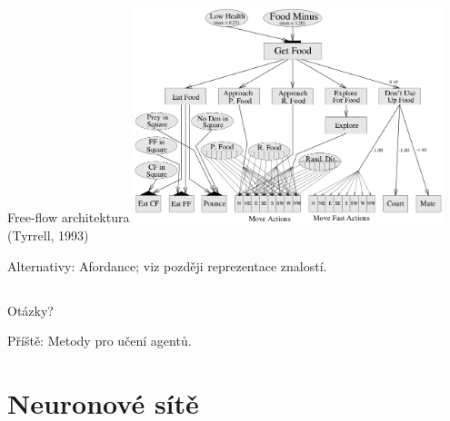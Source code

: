 \documentclass{beamer}
\begin{document}
\subsection{}
\begin{frame}{Free-flow architektura}
\includegraphics[width=9cm]{freeflow.png}
\hfill {\tiny (Tyrrell, 1993)}

Alternativy: Afordance; viz později reprezentace znalostí.
\end{frame}

\subsection{}
\begin{frame}{Otázky?}
\begin{center}
Příště: Metody pro učení agentů.
\end{center}
\end{frame}

\section{Neuronové sítě}
\end{document}
